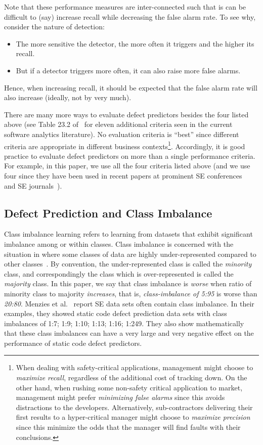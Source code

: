 \documentclass[10pt,conference]{IEEEtran}
\newcommand{\bi}{\begin{itemize}[leftmargin=0.4cm]}
\newcommand{\ei}{\end{itemize}}
\theoremstyle{break}
\theoremstyle{break}
\begin{document}
Note that these performance measures are inter-connected such that is can be difficult to (say) increase recall while decreasing the false alarm rate. To see why,
consider the nature of detection: 
\bi
\item
The more sensitive the detector, the more often it triggers and the higher its recall.
\item
But if a detector triggers more often, it can also raise more false alarms.
\ei
Hence, when increasing recall, it should be expected that the false alarm rate will also increase
(ideally, not by very much).


There are many more ways to evaluate defect predictors besides the four listed above
(see Table 23.2 of~\cite{menzies2014sharing} for   eleven additional
criteria seen in the current software analytics literature).
No evaluation criteria is ``best'' since different  criteria are appropriate in different business contexts\footnote{
When dealing
with safety-critical applications, management might choose to {\em maximize recall}, regardless of the additional
cost of tracking down.
On the other hand, when rushing some non-safety critical application to market, management  might prefer {\em minimizing false alarms} since this avoids distractions to the developers. 
Alternatively, sub-contractors delivering their first
results to a hyper-critical manager might choose to {\em maximize precision} since this minimize the odds that the manager will find faults with their conclusions. 
}. Accordingly, it is good practice to evaluate defect predictors on more than a single performance criteria. For example, in this paper,
we use all the four   criteria listed above
(and we use four since they have
been used in recent papers  
at prominent SE conferences~\cite{ghotra2015revisiting} and SE journals~\cite{fu2016tuning}).







\subsection{Defect Prediction and Class Imbalance}
\label{sect:motivation}

Class imbalance learning refers to learning from datasets that exhibit significant imbalance among or within classes. Class imbalance  is concerned with the situation in where some classes of data are
highly under-represented compared to other classes~\cite{he2009learning}.
By convention,
the under-represented class is called the {\em minority} class,
and correspondingly the class which is over-represented is called the
{\em majority} class. In this paper, we say that class imbalance is {\em worse}
when ratio of minority class to majority {\em increases}, that is,
{\em class-imbalance of 5:95} is worse than {\em 20:80}. Menzies et al.~\cite{menzies2007problems} report SE data sets often contain class imbalance. In their examples, they showed static code defect prediction data sets with
class imbalances of 1:7; 1:9; 1:10; 1:13; 1:16; 1:249.
They also show mathematically that these class imbalances can have a very large and very negative effect on the performance of static code defect predictors.  
\end{document}
